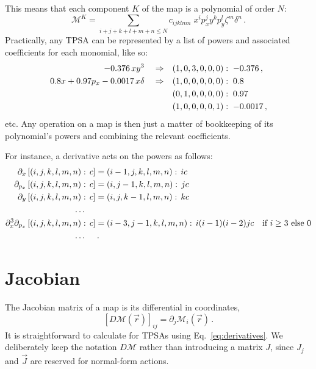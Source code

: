 This means that each component $K$ of the map is a polynomial of order $N$:
\begin{equation}
    \mathcal{M}^K = \sum_{i + j + k + l + m + n \leq N} c_{ijklmn}\;
    x^i p_x^j y^k p_y^l \zeta^m \delta^n \,.
\end{equation}
Practically, any TPSA can be represented by a list of powers and associated coefficients for each monomial, like so:
\begin{align}
    -0.376\, xy^3 \quad\Rightarrow\quad &(1, 0, 3, 0, 0, 0):\; -0.376\,, \\
    0.8x + 0.97p_x -0.0017\, x\delta \quad\Rightarrow\quad
    &(1, 0, 0, 0, 0, 0):\; 0.8 \notag\\
    &(0, 1, 0, 0, 0, 0):\; 0.97 \notag\\
    &(1, 0, 0, 0, 0, 1):\; -0.0017\,,
\end{align}
etc. Any operation on a map is then just a matter of bookkeeping of its polynomial's powers and combining the relevant coefficients.

For instance, a derivative acts on the powers as follows:
\begin{align}\label{eq:derivatives}
    \partial_{x}\left[ (i, j, k, l, m, n):\, c \right] & = (i-1, j, k, l, m, n):\, i c \\
    \partial_{p_x}\left[ (i, j, k, l, m, n):\, c \right] & = (i, j-1, k, l, m, n):\, j c \notag\\
    \partial_{y}\left[ (i, j, k, l, m, n):\, c \right] & = (i, j, k-1, l, m, n):\, k c \notag\\
    \ldots\quad\;& \notag\\
    \partial_x^3\partial_{p_x}\left[ (i, j, k, l, m, n):\, c \right] & = (i-3, j-1, k, l, m, n):\, i(i-1)(i-2) j c \quad \text{if }i\geq 3 \text{ else }0 \notag\\
    \ldots\quad\;& \notag\,.
\end{align}



\section{Jacobian}
The Jacobian matrix of a map is its differential in coordinates,
\begin{equation}
    \left[D\mathcal M(\vec r)\right]_{ij}
    = \partial_j \mathcal M_i(\vec r)\,.
\end{equation}
It is straightforward to calculate for TPSAs using Eq.~\ref{eq:derivatives}.
We deliberately keep the notation $D\mathcal M$ rather than introducing a
matrix $J$, since $J_j$ and $\vec J$ are reserved for normal-form actions.

